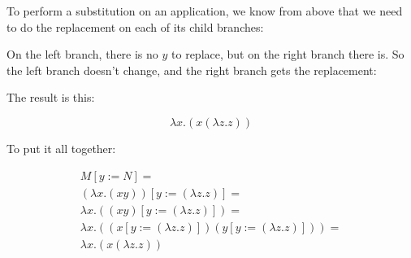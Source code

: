 \documentclass{book}
\numberwithin{equation}{chapter}
\begin{document}
\noindent
To perform a substitution on an application, we know from above that we need to do the replacement on each of its child branches:

\begin{center}
\end{center}

\noindent
On the left branch, there is no $y$ to replace, but on the right branch there is. So the left branch doesn't change, and the right branch gets the replacement:

\begin{center}
\end{center}

\noindent
The result is this:

\begin{equation}
\lambda x.(x (\lambda z.z))
\end{equation}

\noindent
To put it all together:

\begin{align}
M[y := N] = \\
(\lambda x.(x y))[y := (\lambda z.z)] = \\
\lambda x.((x y)[y := (\lambda z.z)]) = \\
\lambda x.((x[y := (\lambda z.z)])(y[y := (\lambda z.z)])) = \\
\lambda x.(x (\lambda z.z))
\end{align}


\end{document}
